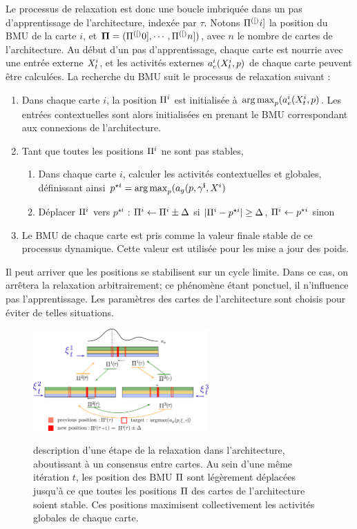 Le processus de relaxation est donc une boucle imbriquée dans un pas d'apprentissage de l'architecture, indexée par $\tau$. Notons $\Pi^{({[})}i]$ la position du BMU de la carte $i$, et $\mathbf{\Pi} = (\Pi^{({[})}0], \cdots , \Pi^{({[})}n])$, avec $n$ le nombre de cartes de l'architecture.
Au début d'un pas d'apprentissage, chaque carte est nourrie avec une entrée externe $X^i_t$, et les activités externes $a_e^i(X^i_t,p)$ de chaque carte peuvent être calculées.
La recherche du BMU suit le processus de relaxation suivant : 
\begin{enumerate}
\item Dans chaque carte $i$, la position $\Pi^i$ est initialisée à $\operatorname*{arg\,max}_p(a_e^i(X^i_t,p)$. Les entrées contextuelles sont alors initialisées en prenant le BMU correspondant aux connexions de l'architecture.
\item Tant que toutes les positions $\Pi^i$ ne sont pas stables, 
	\begin{enumerate}
	\item Dans chaque carte $i$, calculer les activités contextuelles et globales, définissant ainsi $p^{\star i} = \operatorname*{arg\,max}_p(a_g(p,\mathbf{\gamma^i},X^i)$
	\item Déplacer $\Pi^i$ vers $p^{\star i}$ : $\Pi^i \leftarrow \Pi^i \pm \Delta$ si $\lvert \Pi^i - p^{\star i} \rvert \geq \Delta$, $\Pi^i \leftarrow p^{\star i}$ sinon
	\end{enumerate}
	
\item Le BMU de chaque carte est pris comme la valeur finale stable de ce processus dynamique. Cette valeur est utilisée pour les mise a jour des poids.
\end{enumerate}

Il peut arriver que les positions se stabilisent sur un cycle limite. Dans ce cas, on arrêtera la relaxation arbitrairement; ce phénomène étant ponctuel, il n'influence pas l'apprentissage. Les paramètres des cartes de l'architecture sont choisis pour éviter de telles situations.

\begin{figure}
\centering
\includegraphics[width=0.6\textwidth]{relaxation.pdf}
\label{fig:relax}
\caption{description d'une étape de la relaxation dans l'architecture, aboutissant à un consensus entre cartes. Au sein d'une même itération $t$, les position des BMU $\Pi$ sont légèrement déplacées jusqu'à ce que toutes les positions $\Pi$ des cartes de l'architecture soient stable. Ces positions maximisent collectivement les activités globales de chaque carte. }
\end{figure}

